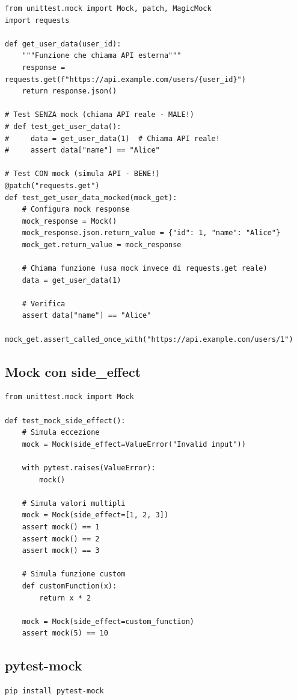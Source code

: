 \begin{lstlisting}
from unittest.mock import Mock, patch, MagicMock
import requests

def get_user_data(user_id):
    """Funzione che chiama API esterna"""
    response = requests.get(f"https://api.example.com/users/{user_id}")
    return response.json()

# Test SENZA mock (chiama API reale - MALE!)
# def test_get_user_data():
#     data = get_user_data(1)  # Chiama API reale!
#     assert data["name"] == "Alice"

# Test CON mock (simula API - BENE!)
@patch("requests.get")
def test_get_user_data_mocked(mock_get):
    # Configura mock response
    mock_response = Mock()
    mock_response.json.return_value = {"id": 1, "name": "Alice"}
    mock_get.return_value = mock_response

    # Chiama funzione (usa mock invece di requests.get reale)
    data = get_user_data(1)

    # Verifica
    assert data["name"] == "Alice"
    mock_get.assert_called_once_with("https://api.example.com/users/1")
\end{lstlisting}

\subsection{Mock con side\_effect}

\begin{lstlisting}
from unittest.mock import Mock

def test_mock_side_effect():
    # Simula eccezione
    mock = Mock(side_effect=ValueError("Invalid input"))

    with pytest.raises(ValueError):
        mock()

    # Simula valori multipli
    mock = Mock(side_effect=[1, 2, 3])
    assert mock() == 1
    assert mock() == 2
    assert mock() == 3

    # Simula funzione custom
    def customFunction(x):
        return x * 2

    mock = Mock(side_effect=custom_function)
    assert mock(5) == 10
\end{lstlisting}

\subsection{pytest-mock}

\begin{lstlisting}[language=bash]
pip install pytest-mock
\end{lstlisting}

